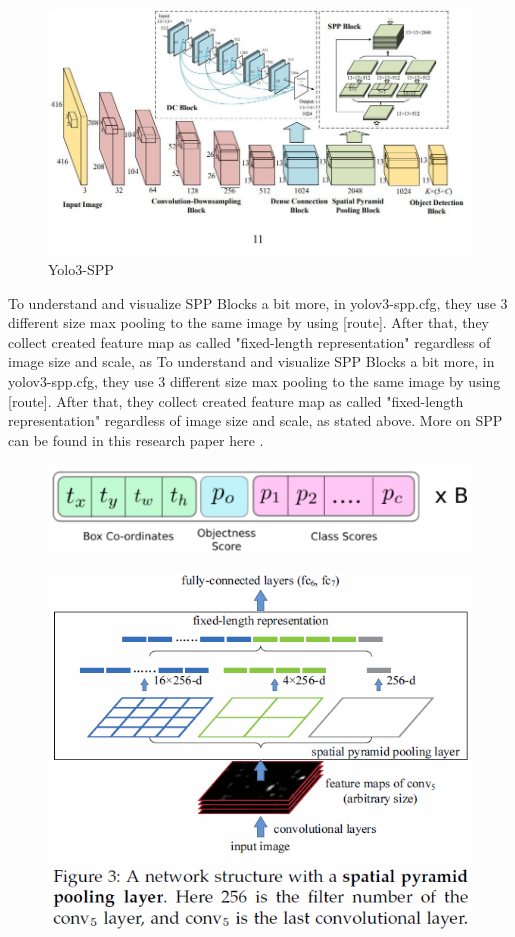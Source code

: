 \documentclass[oneside]{article}
\begin{document}
\begin{figure}
\centering
\includegraphics[width=0.8\linewidth]{images/spp-f1}
\caption{Yolo3-SPP}
\label{fig:spp-f1}
\end{figure}
To understand and visualize SPP Blocks a bit more, in \textsf{yolov3-spp.cfg}, they use 3 different size max pooling to the same image by using [route]. After that, they collect created feature map as called "fixed-length representation" regardless of image size and scale, as To understand and visualize SPP Blocks a bit more, in \textsf{yolov3-spp.cfg}, they use 3 different size max pooling to the same image by using [route]. After that, they collect created feature map as called "fixed-length representation" regardless of image size and scale, as stated above. More on SPP can be found in this research paper here \cite{He2014}.

\begin{figure}
\centering
\includegraphics[width=0.7\linewidth]{images/spp-f2}
\caption{}
\label{fig:spp-f2}
\end{figure}


\begin{figure}
\centering
\includegraphics[width=0.7\linewidth]{images/spp-f3}
\caption{}
\label{fig:spp-f3}
\end{figure}
\end{document}
